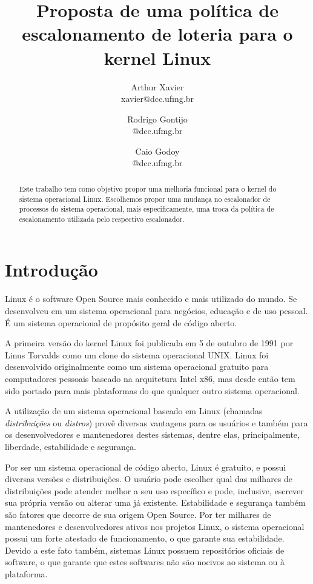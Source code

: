 \documentclass[a4paper,12pt]{article}
\title{Proposta de uma política de escalonamento de loteria para o kernel Linux}
\author{
    Arthur Xavier\\
    \small{xavier@dcc.ufmg.br}
    \and
    Rodrigo Gontijo\\
    \small{@dcc.ufmg.br}
    \and
    Caio Godoy\\
    \small{@dcc.ufmg.br}
}
\begin{document}
\maketitle

\begin{abstract}
  Este trabalho tem como objetivo propor uma melhoria funcional para o kernel do sistema operacional Linux. Escolhemos propor uma mudança no escalonador de processos do sistema operacional, mais especificamente, uma troca da política de escalonamento utilizada pelo respectivo escalonador.
\end{abstract}

\section{Introdução}
Linux é o software Open Source mais conhecido e mais utilizado do mundo. Se desenvolveu em um sistema operacional para negócios, educação e de uso pessoal. É um sistema operacional de propósito geral de código aberto. \cite{Welsh1998}

A primeira versão do kernel Linux foi publicada em 5 de outubro de 1991 por Linus Torvalds como um clone do sistema operacional UNIX. Linux foi desenvolvido originalmente como um sistema operacional gratuito para computadores pessoais baseado na arquitetura Intel x86, mas desde então tem sido portado para mais plataformas do que qualquer outro sistema operacional. \cite{LinuxWikipedia2016}

A utilização de um sistema operacional baseado em Linux (chamadas \emph{distribuições} ou \emph{distros}) provê diversas vantagens para os usuários e também para os desenvolvedores e mantenedores destes sistemas, dentre elas, principalmente, liberdade, estabilidade e segurança.

Por ser um sistema operacional de código aberto, Linux é gratuito, e possui diversas versões e distribuições. O usuário pode escolher qual das milhares de distribuições pode atender melhor a seu uso específico e pode, inclusive, escrever sua própria versão ou alterar uma já existente. Estabilidade e segurança também são fatores que decorre de sua origem Open Source. Por ter milhares de mantenedores e desenvolvedores ativos nos projetos Linux, o sistema operacional possui um forte atestado de funcionamento, o que garante sua estabilidade. Devido a este fato também, sistemas Linux possuem repositórios oficiais de software, o que garante que estes softwares não são nocivos ao sistema ou à plataforma.
\end{document}
